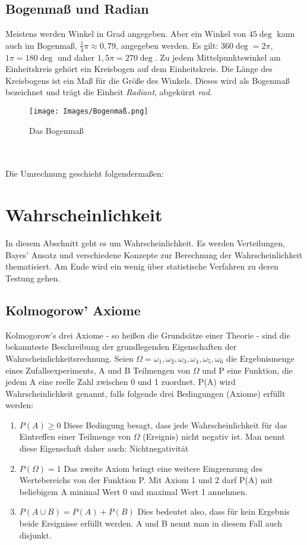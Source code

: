 \documentclass{scrreprt}
\begin{document}
\subsection{Bogenmaß und Radian}\label{Bogenmaß und Radian}
Meistens werden Winkel in Grad angegeben. Aber ein Winkel von $45\deg$ kann auch im Bogenmaß, $\frac{1}{4}\pi \approx 0,79$, angegeben werden.
Es gilt: $360\deg = 2\pi$, $1\pi = 180\deg$ und daher $1,5\pi = 270\deg$. 
Zu jedem Mittelpunktswinkel am Einheitskreis gehört ein Kreisbogen auf dem Einheitskreis.
Die Länge des Kreisbogens ist ein Maß für die Größe des Winkels. Dieses wird als Bogenmaß bezeichnet und trägt die Einheit \textit{Radiant}, abgekürzt \textit{rad}. 
\begin{figure}[h]
    \centering
    \texttt{[image: Images/Bogenmaß.png]}
    \caption{Das Bogenmaß}
    \label{Figur 4}
\end{figure}\\
\\ Die Umrechnung geschieht folgendermaßen: 
\section{Wahrscheinlichkeit}\label{Wahrscheinlichkeit}
In diesem Abschnitt geht es um Wahrscheinlichkeit. Es werden Verteilungen, Bayes' Ansatz und verschiedene Konzepte zur Berechnung der Wahrscheinlichkeit thematisiert. Am Ende wird ein wenig über statistische Verfahren zu deren Testung gehen.
\subsection{Kolmogorow' Axiome}\label{Kolmogorow's Axiome}
Kolmogorow's drei Axiome - so heißen die Grundsätze einer Theorie - sind die bekannteste Beschreibung der grundlegenden Eigenschaften der Wahrscheinlichkeitsrechnung.
Seien $\Omega={\omega_1, \omega_2, \omega_3, \omega_4, \omega_5, \omega_6}$ die Ergebnismenge eines Zufallsexperiments, A und B Teilmengen von $\Omega$ und P eine Funktion, die jedem A eine reelle Zahl zwischen 0 und 1 zuordnet.
P(A) wird Wahrscheinlichkeit genannt, falls folgende drei Bedingungen (Axiome) erfüllt werden:
\begin{enumerate}
    \item $P(A)\geq0$ Diese Bedingung besagt, dass jede Wahrscheinlichkeit für das Eintreffen einer Teilmenge von $\Omega$ (Ereignis) nicht negativ ist. Man nennt diese Eigenschaft daher auch: Nichtnegativität
    \item $P(\Omega)=1$ Das zweite Axiom bringt eine weitere Eingrenzung des Wertebereichs von der Funktion P. Mit Axiom 1 und 2 darf P(A) mit beliebigem A minimal Wert 0 und maximal Wert 1 annehmen.
    \item $P(A \cup B)=P(A)+P(B)$ Dies bedeutet also, dass für kein Ergebnis beide Ereignisse erfüllt werden. A und B nennt man in diesem Fall auch disjunkt.
\end{enumerate}
\end{document}
